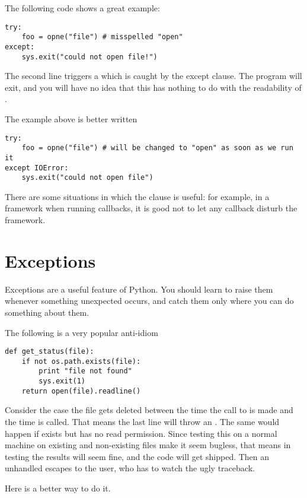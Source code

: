 \documentclass{howto}
\begin{document}
The following code shows a great example:

\begin{verbatim}
try:
    foo = opne("file") # misspelled "open"
except:
    sys.exit("could not open file!")
\end{verbatim}

The second line triggers a  which is caught by the
except clause. The program will exit, and you will have no idea that
this has nothing to do with the readability of .

The example above is better written

\begin{verbatim}
try:
    foo = opne("file") # will be changed to "open" as soon as we run it
except IOError:
    sys.exit("could not open file")
\end{verbatim}

There are some situations in which the  clause is useful:
for example, in a framework when running callbacks, it is good not to
let any callback disturb the framework.

\section{Exceptions}

Exceptions are a useful feature of Python. You should learn to raise
them whenever something unexpected occurs, and catch them only where
you can do something about them.

The following is a very popular anti-idiom

\begin{verbatim}
def get_status(file):
    if not os.path.exists(file):
        print "file not found"
        sys.exit(1)
    return open(file).readline()
\end{verbatim}

Consider the case the file gets deleted between the time the call to 
 is made and the time  is called.
That means the last line will throw an . The same would
happen if  exists but has no read permission. Since testing this
on a normal machine on existing and non-existing files make it seem bugless,
that means in testing the results will seem fine, and the code will get
shipped. Then an unhandled  escapes to the user, who
has to watch the ugly traceback.

Here is a better way to do it.
\end{document}
